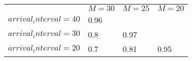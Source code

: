 \begin{tabular}{l  | l  | l  | l }
& \multicolumn{1}{c}{$M=30$} & \multicolumn{1}{c}{$M=25$} & \multicolumn{1}{c}{$M=20$} \\
$arrival_interval=40$ & 0.96 &  &  \\
$arrival_interval=30$ & 0.8 & 0.97 &  \\
$arrival_interval=20$ & 0.7 & 0.81 & 0.95
\end{tabular}